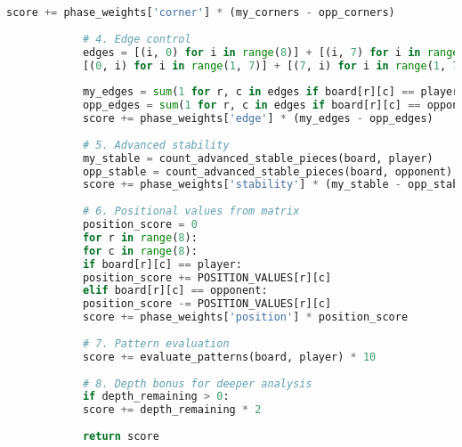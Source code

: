 \documentclass[12pt]{article}
\newenvironment{ltrcode}{\lr\bgroup}{\egroup}
\begin{document}
\begin{ltrcode}
\begin{lstlisting}[language=Python, caption=Complete Advanced Evaluation Function]
			score += phase_weights['corner'] * (my_corners - opp_corners)
			
			# 4. Edge control
			edges = [(i, 0) for i in range(8)] + [(i, 7) for i in range(8)] + \
			[(0, i) for i in range(1, 7)] + [(7, i) for i in range(1, 7)]
			
			my_edges = sum(1 for r, c in edges if board[r][c] == player)
			opp_edges = sum(1 for r, c in edges if board[r][c] == opponent)
			score += phase_weights['edge'] * (my_edges - opp_edges)
			
			# 5. Advanced stability
			my_stable = count_advanced_stable_pieces(board, player)
			opp_stable = count_advanced_stable_pieces(board, opponent)
			score += phase_weights['stability'] * (my_stable - opp_stable)
			
			# 6. Positional values from matrix
			position_score = 0
			for r in range(8):
			for c in range(8):
			if board[r][c] == player:
			position_score += POSITION_VALUES[r][c]
			elif board[r][c] == opponent:
			position_score -= POSITION_VALUES[r][c]
			score += phase_weights['position'] * position_score
			
			# 7. Pattern evaluation
			score += evaluate_patterns(board, player) * 10
			
			# 8. Depth bonus for deeper analysis
			if depth_remaining > 0:
			score += depth_remaining * 2
			
			return score
		\end{lstlisting}
	\end{ltrcode}
\end{document}
